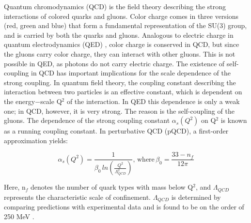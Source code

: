 Quantum chromodynamics (QCD) \cite{QCD1,QCD2,QCD3,QCD4} is the field theory describing the
strong interactions of colored quarks and gluons. Color charge comes in three versions
(red, green and blue) that form a fundamental representation of the SU(3) group,
and is carried by both the quarks and gluons. Analogous to electric charge in quantum
electrodynamics (QED) \cite{QED1,QED2}, color charge is conserved in QCD, but since the gluons
carry color charge, they can interact with other gluons. This is not possible in QED,
as photons do not carry electric charge. The existence of self-coupling in QCD has
important implications for the scale dependence of the strong coupling.
In quantum field theory, the coupling constant describing the interaction between
two particles is an effective constant, which is dependent on the energy$-$scale Q$^2$ of
the interaction. In QED this dependence is only a weak one; in QCD, however, it
is very strong. The reason is the self-coupling of the gluons. The dependence of the
strong coupling constant $\alpha_s(Q^2)$ on Q$^2$ is known as a running coupling constant. In
perturbative QCD (pQCD), a first-order approximation yields:

\begin{equation}
\label{eq:QCD}
\alpha_s(Q^2) = \frac{1}{\beta_0\,ln(\frac{Q^2}{\Lambda^{2}_{QCD}})},\,\mbox{where}\,\beta_0 = \frac{33-n_f}{12\pi}
\end{equation}

Here, n$_f$ denotes the number of quark types with mass below Q$^2$, and $\Lambda_{QCD}$ represents
the characteristic scale of confinement. $\Lambda_{QCD}$ is determined by comparing predictions
with experimental data and is found to be on the order of 250 MeV \cite{QCD5}.


